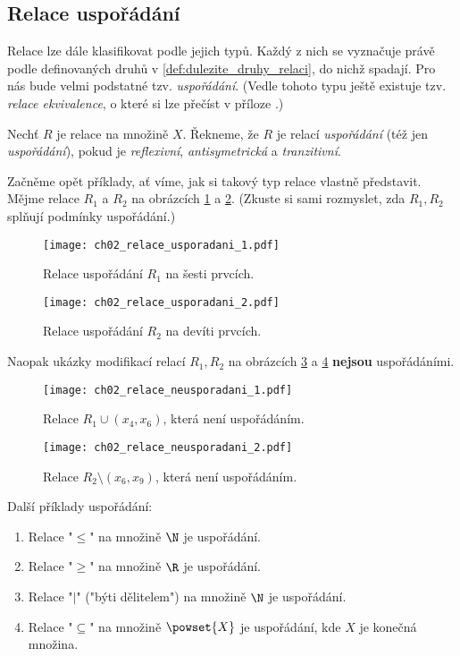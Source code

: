 \subsection{Relace uspořádání}\label{subsec:relace_usporadani}
Relace lze dále klasifikovat podle jejich typů. Každý z nich se vyznačuje právě podle definovaných druhů v \ref{def:dulezite_druhy_relaci}, do nichž spadají. Pro nás bude velmi podstatné tzv. \emph{uspořádání}. (Vedle tohoto typu ještě existuje tzv. \emph{relace ekvivalence}, o které si lze přečíst v příloze .)
\begin{definition}[Uspořádání]
    Nechť $R$ je relace na množině $X$. Řekneme, že $R$ je relací \emph{uspořádání} (též jen \emph{uspořádání}), pokud je \emph{reflexivní}, \emph{antisymetrická} a \emph{tranzitivní}.
\end{definition}
Začněme opět příklady, ať víme, jak si takový typ relace vlastně představit. Mějme relace $R_1$ a $R_2$ na obrázcích \ref{fig:relace_usporadani_1} a \ref{fig:relace_usporadani_2}. (Zkuste si sami rozmyslet, zda $R_1,R_2$ splňují podmínky uspořádání.)
\begin{figure}[H]
    \centering
    \texttt{[image: ch02\_relace\_usporadani\_1.pdf]}
    \caption{Relace uspořádání $R_1$ na šesti prvcích.}
    \label{fig:relace_usporadani_1}
\end{figure}
\begin{figure}[H]
    \centering
    \texttt{[image: ch02\_relace\_usporadani\_2.pdf]}
    \caption{Relace uspořádání $R_2$ na devíti prvcích.}
    \label{fig:relace_usporadani_2}
\end{figure}
Naopak ukázky modifikací relací $R_1,R_2$ na obrázcích \ref{fig:relace_neusporadani_1} a \ref{fig:relace_neusporadani_2} \textbf{nejsou} uspořádáními.
\begin{figure}[H]
    \centering
    \texttt{[image: ch02\_relace\_neusporadani\_1.pdf]}
    \caption{Relace $R_1\cup (x_4,x_6)$, která není uspořádáním.}
    \label{fig:relace_neusporadani_1}
\end{figure}
\begin{figure}[H]
    \centering
    \texttt{[image: ch02\_relace\_neusporadani\_2.pdf]}
    \caption{Relace $R_2\setminus (x_6,x_9)$, která není uspořádáním.}
    \label{fig:relace_neusporadani_2}
\end{figure}
\begin{example}
    Další příklady uspořádání:
    \begin{enumerate}[label=(\roman*)]
        \item Relace "$\leq$" na množině $\N$ je uspořádání.
        \item Relace "$\geq$" na množině $\R$ je uspořádání.
        \item Relace "$\mid$" ("býti dělitelem") na množině $\N$ je uspořádání.
        \item Relace "$\subseteq$" na množině $\powset{X}$ je uspořádání, kde $X$ je konečná množina.
    \end{enumerate}
\end{example}
